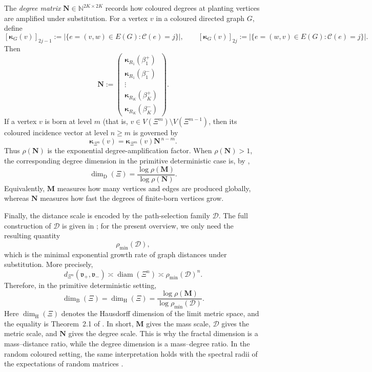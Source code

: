 \documentclass{article}
\theoremstyle{plain}
\theoremstyle{definition}
\newcommand{\dimbox}{\dim_\mathrm{B}}
\newcommand{\dimdeg}{\dim_\mathrm{D}}
\newcommand{\dimhaus}{\dim_\mathrm{H}}
\begin{document}
The \emph{degree matrix} \(\mathbf N\in\mathbb N^{2K\times 2K}\) records how coloured degrees at planting vertices are amplified under substitution. For a vertex \(v\) in a coloured directed graph \(G\), define
\[
    [\boldsymbol \kappa_G(v)]_{2j-1}
    :=
    \bigl|\{e=(v,w)\in E(G): \mathscr C(e)=j\}\bigr|,
    \qquad
    [\boldsymbol \kappa_G(v)]_{2j}
    :=
    \bigl|\{e=(w,v)\in E(G): \mathscr C(e)=j\}\bigr|.
\]
Then
\[
    \mathbf N
    :=
    \begin{pmatrix}
        \boldsymbol \kappa_{R_1}(\beta_1^+)\\
        \boldsymbol \kappa_{R_1}(\beta_1^-)\\
        \vdots\\
        \boldsymbol \kappa_{R_K}(\beta_K^+)\\
        \boldsymbol \kappa_{R_K}(\beta_K^-)
    \end{pmatrix}.
\]
If a vertex \(v\) is born at level \(m\) (that is, \(v\in V(\Xi^m)\setminus V(\Xi^{m-1})\), then its coloured incidence vector at level \(n\ge m\) is governed by
\[
    \boldsymbol \kappa_{\Xi^n}(v)=\boldsymbol \kappa_{\Xi^m}(v)\mathbf N^{\,n-m}.
\]
Thus \(\rho(\mathbf N)\) is the exponential degree-amplification factor. When \(\rho(\mathbf N)>1\), the corresponding degree dimension in the primitive deterministic case is, by \cite{li2024on},
\[
    \dimdeg(\Xi)
    =
    \frac{\log \rho(\mathbf M)}{\log \rho(\mathbf N)}.
\]
Equivalently, \(\mathbf M\) measures how many vertices and edges are produced globally, whereas \(\mathbf N\) measures how fast the degrees of finite-born vertices grow.

Finally, the distance scale is encoded by the path-selection family \(\mathcal D\). The full construction of \(\mathcal D\) is given in \cite{neroli2024fractal}; for the present overview, we only need the resulting quantity
\[
    \rho_{\min}(\mathcal D),
\]
which is the minimal exponential growth rate of graph distances under substitution. More precisely,
\[
    d_{\Xi^n}(\mathfrak v_+,\mathfrak v_-)
    \asymp
    \operatorname{diam}(\Xi^n)
    \asymp
    \rho_{\min}(\mathcal D)^n .
\]
Therefore, in the primitive deterministic setting,
\[
    \dimbox(\Xi)
    =
    \dimhaus(\Xi)
    =
    \frac{\log \rho(\mathbf M)}
         {\log \rho_{\min}(\mathcal D)} .
\]
Here $\dimhaus(\Xi)$ denotes the Hausdorff dimension of the limit metric space, and the equality is Theorem~2.1 of \cite{neroli2024fractal}.
In short, \(\mathbf M\) gives the mass scale, \(\mathcal D\) gives the metric scale, and \(\mathbf N\) gives the degree scale. This is why the fractal dimension is a mass--distance ratio, while the degree dimension is a mass--degree ratio. 
In the random coloured setting, the same interpretation holds with the spectral radii of the expectations of random matrices \cite{hambly2010diffusion}.
\end{document}
